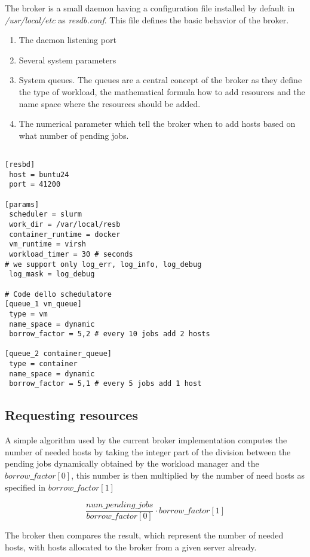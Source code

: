 \documentclass{report}
\begin{document}
The broker is a small daemon having a configuration file installed by default in \textit{/usr/local/etc} as \textit{resdb.conf}. This file defines the basic behavior of the broker.

\begin{enumerate}
    \item The daemon listening port
    \item Several system parameters
    \item System queues. The queues are a central concept of the broker as they define the type of workload, the mathematical formula how to add resources and the name space where the resources should be added.
    \item The numerical parameter which tell the broker when to add hosts based on what number of pending jobs.
\end{enumerate}

\begin{verbatim}

[resbd]
 host = buntu24
 port = 41200

[params]
 scheduler = slurm
 work_dir = /var/local/resb
 container_runtime = docker
 vm_runtime = virsh
 workload_timer = 30 # seconds
# we support only log_err, log_info, log_debug
 log_mask = log_debug

# Code dello schedulatore
[queue_1 vm_queue]
 type = vm
 name_space = dynamic
 borrow_factor = 5,2 # every 10 jobs add 2 hosts

[queue_2 container_queue]
 type = container
 name_space = dynamic
 borrow_factor = 5,1 # every 5 jobs add 1 host
\end{verbatim}


\subsection{Requesting resources}
A simple algorithm used by the current broker implementation computes the number of needed hosts by taking the integer part of the division between
the pending jobs dynamically obtained by the workload manager and the $borrow\_factor[0]$, this number is then multiplied by the number of need hosts as specified in $borrow\_factor[1]$

\[
\frac{num\_pending\_jobs}{borrow\_factor[0]}\cdot borrow\_factor[1]
\]

The broker then compares the result, which represent the number of needed hosts, with hosts allocated to the broker from a given server already.
\end{document}
